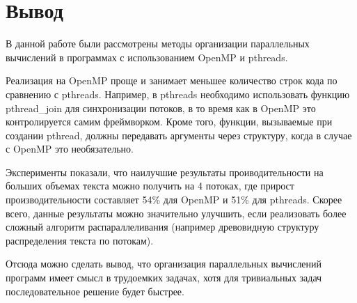 \clearpage
{}
\section*{Вывод}
В данной работе были рассмотрены методы организации параллельных вычислений в программах с использованием OpenMP и pthreads.

Реализация на OpenMP проще и занимает меньшее количество строк кода по сравнению с pthreads. Например, в pthreads необходимо использовать функцию pthread\_join для синхронизации потоков, в то время как в OpenMP это контролируется самим фреймворком. Кроме того, функции, вызываемые при создании pthread, должны передавать аргументы через структуру, когда в случае с OpenMP это необязательно.

Эксперименты показали, что наилучшие результаты проиводительности на больших объемах текста можно получить на 4 потоках, где прирост производительности составляет 54\% для OpenMP и 51\% для pthreads. Скорее всего, данные результаты можно значительно улучшить, если реализовать более сложный алгоритм распараллеливания (например древовидную структуру распределения текста по потокам).

Отсюда можно сделать вывод, что организация параллельных вычислений программ имеет смысл в трудоемких задачах, хотя для тривиальных задач последовательное решение будет быстрее.
